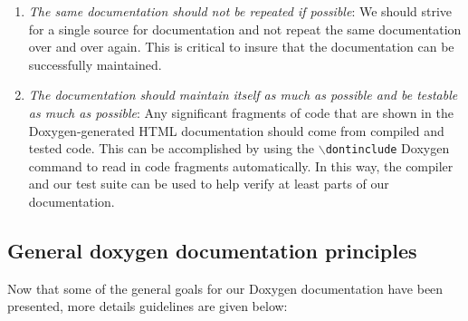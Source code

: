 \begin{enumerate}
{}\item\textit{The same documentation should not be repeated if possible}: We
should strive for a single source for documentation and not repeat the same
documentation over and over again.  This is critical to insure that the
documentation can be successfully maintained.

{}\item\textit{The documentation should maintain itself as much as possible
and be testable as much as possible}: Any significant fragments of code that
are shown in the Doxygen-generated HTML documentation should come from
compiled and tested code.  This can be accomplished by using the
{}\texttt{$\backslash$dontinclude} Doxygen command to read in code fragments
automatically.  In this way, the compiler and our test suite can be used to
help verify at least parts of our documentation.

\end{enumerate}

%
\subsection{General doxygen documentation principles}
%

Now that some of the general goals for our Doxygen documentation have been
presented, more details guidelines are given below:

